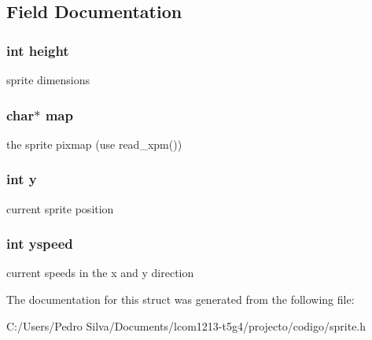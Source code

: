 \subsection{Field Documentation}
\hypertarget{struct_sprite_ad12fc34ce789bce6c8a05d8a17138534}{
\subsubsection[{height}]{\setlength{\rightskip}{0pt plus 5cm}int height}}\label{struct_sprite_ad12fc34ce789bce6c8a05d8a17138534}
sprite dimensions \hypertarget{struct_sprite_a7b00b1bfd666e26484471bd17a74eaa9}{
\subsubsection[{map}]{\setlength{\rightskip}{0pt plus 5cm}char$\ast$ map}}\label{struct_sprite_a7b00b1bfd666e26484471bd17a74eaa9}
the sprite pixmap (use read\-\_\-xpm()) \hypertarget{struct_sprite_a0a2f84ed7838f07779ae24c5a9086d33}{
\subsubsection[{y}]{\setlength{\rightskip}{0pt plus 5cm}int y}}\label{struct_sprite_a0a2f84ed7838f07779ae24c5a9086d33}
current sprite position \hypertarget{struct_sprite_a8e19090b4aa5dd9bb43efe8b74488f6d}{
\subsubsection[{yspeed}]{\setlength{\rightskip}{0pt plus 5cm}int yspeed}}\label{struct_sprite_a8e19090b4aa5dd9bb43efe8b74488f6d}
current speeds in the x and y direction 

The documentation for this struct was generated from the following file\-:\begin{DoxyCompactItemize}
\item 
C\-:/\-Users/\-Pedro Silva/\-Documents/lcom1213-\/t5g4/projecto/codigo/sprite.\-h\end{DoxyCompactItemize}
